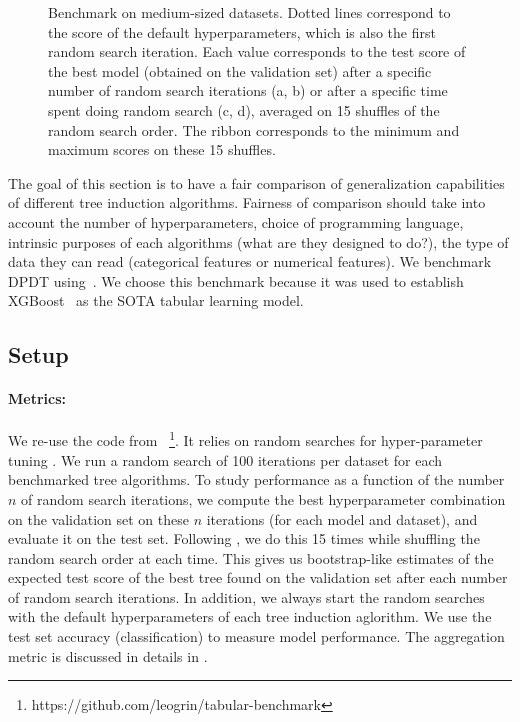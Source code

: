 \begin{figure}
\begin{minipage}{0.24\textwidth}
        \label{fig:classif-cat-all}
    \end{minipage}
\caption{Benchmark on medium-sized datasets. Dotted lines correspond to the score of the default hyperparameters, which is also the first random search iteration. Each value corresponds to the test score of the best model (obtained on the validation set) after a specific number of random search iterations (a, b) or after a specific time spent doing random search (c, d), averaged on 15 shuffles of the random search order. The ribbon corresponds to the minimum and maximum scores on these 15 shuffles.}\label{fig:gen-classif}
\end{figure}

The goal of this section is to have a fair comparison of generalization capabilities of different tree induction algorithms. Fairness of comparison should take into account the number of hyperparameters, choice of programming language, intrinsic purposes of each algorithms (what are they designed to do?), the type of data they can read (categorical features or numerical features). We benchmark DPDT using~\cite{grinsztajn2022tree}. We choose this benchmark because it was used to establish XGBoost~\cite{xgb} as the SOTA tabular learning model. 

\subsection{Setup}

\paragraph{Metrics:} We re-use the code from \cite{grinsztajn2022tree}~\footnote{https://github.com/leogrin/tabular-benchmark}. It relies on random searches for hyper-parameter tuning \cite{pmlr-v28-bergstra13}. We run a random search of 100 iterations per dataset for each benchmarked tree algorithms. To study performance as a function of the number $n$ of random search iterations, we compute the best hyperparameter combination on the validation set on these $n$ iterations (for each model and dataset), and evaluate it on the test set. Following \cite{grinsztajn2022tree}, we do this 15 times while shuffling the random search order at each time. This gives us bootstrap-like estimates of the expected test score of the best tree found on the validation set after each number of random search iterations. In addition, we always start the random searches with the default hyperparameters of each tree induction aglorithm. We use the test set accuracy (classification) to measure model performance. The aggregation metric is discussed in details in \cite[section 3]{grinsztajn2022tree}.

